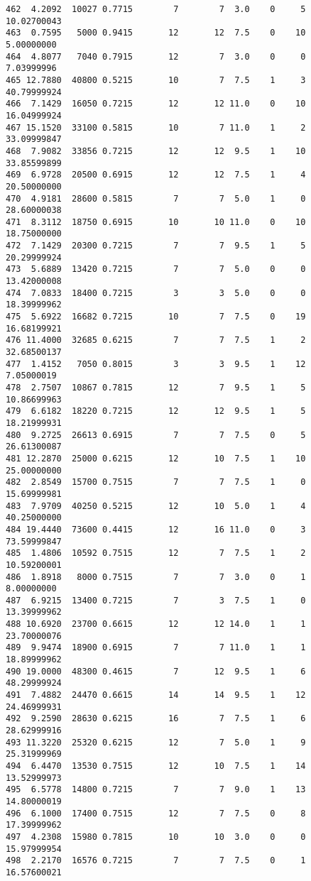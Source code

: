 \documentclass[
  letterpaper,
  DIV=11,
  numbers=noendperiod]{scrreprt}
\begin{document}
\begin{verbatim}
462  4.2092  10027 0.7715        7        7  3.0    0     5 10.02700043
463  0.7595   5000 0.9415       12       12  7.5    0    10  5.00000000
464  4.8077   7040 0.7915       12        7  3.0    0     0  7.03999996
465 12.7880  40800 0.5215       10        7  7.5    1     3 40.79999924
466  7.1429  16050 0.7215       12       12 11.0    0    10 16.04999924
467 15.1520  33100 0.5815       10        7 11.0    1     2 33.09999847
468  7.9082  33856 0.7215       12       12  9.5    1    10 33.85599899
469  6.9728  20500 0.6915       12       12  7.5    1     4 20.50000000
470  4.9181  28600 0.5815        7        7  5.0    1     0 28.60000038
471  8.3112  18750 0.6915       10       10 11.0    0    10 18.75000000
472  7.1429  20300 0.7215        7        7  9.5    1     5 20.29999924
473  5.6889  13420 0.7215        7        7  5.0    0     0 13.42000008
474  7.0833  18400 0.7215        3        3  5.0    0     0 18.39999962
475  5.6922  16682 0.7215       10        7  7.5    0    19 16.68199921
476 11.4000  32685 0.6215        7        7  7.5    1     2 32.68500137
477  1.4152   7050 0.8015        3        3  9.5    1    12  7.05000019
478  2.7507  10867 0.7815       12        7  9.5    1     5 10.86699963
479  6.6182  18220 0.7215       12       12  9.5    1     5 18.21999931
480  9.2725  26613 0.6915        7        7  7.5    0     5 26.61300087
481 12.2870  25000 0.6215       12       10  7.5    1    10 25.00000000
482  2.8549  15700 0.7515        7        7  7.5    1     0 15.69999981
483  7.9709  40250 0.5215       12       10  5.0    1     4 40.25000000
484 19.4440  73600 0.4415       12       16 11.0    0     3 73.59999847
485  1.4806  10592 0.7515       12        7  7.5    1     2 10.59200001
486  1.8918   8000 0.7515        7        7  3.0    0     1  8.00000000
487  6.9215  13400 0.7215        7        3  7.5    1     0 13.39999962
488 10.6920  23700 0.6615       12       12 14.0    1     1 23.70000076
489  9.9474  18900 0.6915        7        7 11.0    1     1 18.89999962
490 19.0000  48300 0.4615        7       12  9.5    1     6 48.29999924
491  7.4882  24470 0.6615       14       14  9.5    1    12 24.46999931
492  9.2590  28630 0.6215       16        7  7.5    1     6 28.62999916
493 11.3220  25320 0.6215       12        7  5.0    1     9 25.31999969
494  6.4470  13530 0.7515       12       10  7.5    1    14 13.52999973
495  6.5778  14800 0.7215        7        7  9.0    1    13 14.80000019
496  6.1000  17400 0.7515       12        7  7.5    0     8 17.39999962
497  4.2308  15980 0.7815       10       10  3.0    0     0 15.97999954
498  2.2170  16576 0.7215        7        7  7.5    0     1 16.57600021

\end{verbatim}
\end{document}

